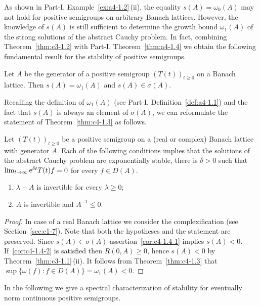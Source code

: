 As shown in Part-I, Example~\ref{ex:a4-1.2}\,(ii), the equality $s(A) = \omega_{0}(A)$ may not hold for positive semigroups on arbitrary Banach lattices.
However, the knowledge of\/ $s(A)$ is still sufficient to determine the growth bound $\omega_{1}(A)$ of the strong solutions of the abstract Cauchy problem.
In fact, combining 
Theorem~\ref{thm:c3-1.2} with 
Part-I, Theorem~\ref{thm:a4-1.4} 
we obtain the following fundamental result for the stability of positive semigroups.
\begin{theorem}\label{thm:c4-1.3}
Let $A$ be the generator of a positive semigroup $(T(t))_{t\geq 0}$ on a Banach lattice.
Then $s(A) = \omega_{1}(A)$ and $s(A) \in \sigma(A)$.
\end{theorem}
Recalling the definition of\/ $\omega_{1}(A)$ 
(see Part-I, Definition~\ref{def:a4-1.1}) 
and the fact that $s(A)$ is always an element of\/ $\sigma(A)$, we can reformulate the statement of Theorem~\ref{thm:c4-1.3} as follows.
\begin{corollary}\label{cor:c4-1.4}%
Let $(T(t))_{t\geq 0}$ be a positive semigroup on a (real or complex) Banach lattice with generator $A$.
Each of the following conditions implies that the solutions of the abstract Cauchy problem are exponentially stable, \ie  there is $\delta > 0$ such that $\lim_{t \to \infty} \mathrm{e}^{\delta t}T(t)f = 0$ for every $f \in D(A)$.
\begin{enumerate}[\upshape (i)]
    \item \label{cor:c4-1.4-1}
    $\lambda - A$ is invertible for every $\lambda \geq 0$;
    \item \label{cor:c4-1.4-2}
    $A$ is invertible and $A^{-1} \leq 0$.
    \end{enumerate}
\end{corollary}
\begin{proof}
In case of a real Banach lattice we consider the complexification 
(see Section~\ref{sec:c1-7}).
Note that both the hypotheses and the statement are preserved.
Since $s(A) \in \sigma(A)$ assertion~\ref{cor:c4-1.4-1} implies $s(A) < 0$.
If~\ref{cor:c4-1.4-2} is satisfied then $R(0,A) \geq 0$, hence $s(A) < 0$ by Theorem~\ref{thm:c3-1.1}\,(ii).
It follows from Theorem~\ref{thm:c4-1.3} that $\sup\{\omega(f) \colon f \in D(A)\} = \omega_{1}(A) < 0$.
\end{proof}
In the following we give a spectral characterization of stability for eventually norm continuous positive semigroups.
